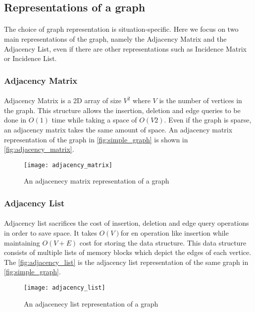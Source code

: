 \subsection{Representations of a graph}

\paragraph{}
The choice of graph representation is situation-specific. Here we focus on two main representations of the graph, namely the Adjacency Matrix and the Adjacency List, even if there are other representations such as Incidence Matrix or Incidence List.

\subsubsection{Adjacency Matrix}

\paragraph{}
Adjacency Matrix is a 2D array of size \(V^2\) where \(V\) is the number of vertices in the graph. This structure allows the insertion, deletion and edge queries to be done in \(O(1)\) time while taking a space of \(O(V2)\). Even if the graph is sparse, an adjacency matrix takes the same amount of space.  An adjacency matrix representation of the graph in \autoref{fig:simple_graph} is shown in \autoref{fig:adjacency_matrix}.

\begin{figure}[H]
    \centering \texttt{[image: adjacency\_matrix]}
    \caption{An adjacenecy matrix representation of a graph}
    \label{fig:adjacency_matrix}
\end{figure}

\subsubsection{Adjacency List}

\paragraph{}
Adjacency list sacrifices the cost of insertion, deletion and edge query operations in order to save space. It takes \(O(V)\)for en operation like insertion while maintaining \(O(V+E)\) cost for storing the data structure. This data structure consists of multiple lists of memory blocks which depict the edges of each vertice. The \autoref{fig:adjacency_list} is the adjacency list representation of the same graph in \autoref{fig:simple_graph}.

\begin{figure}[H]
    \centering \texttt{[image: adjacency\_list]}
    \caption{An adjacenecy list representation of a graph}
    \label{fig:adjacency_list}
\end{figure}